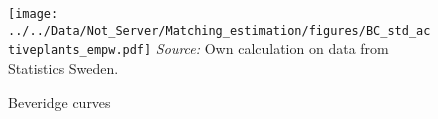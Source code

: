 \begin{figure}[h]
\centering
\caption{Beveridge curves}
\texttt{[image: ../../Data/Not\_Server/Matching\_estimation/figures/BC\_std\_activeplants\_empw.pdf]}
\flushleft
\footnotesize{\emph{Source:} Own calculation on data from Statistics Sweden.}
\label{fig:Beveridge}
\end{figure}